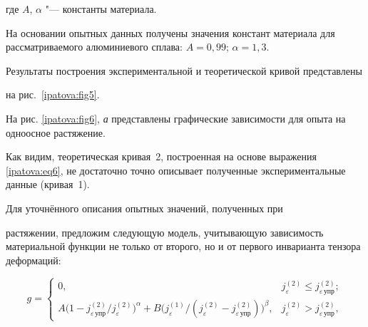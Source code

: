где $A$, $\alpha $ "--- константы материала.



На основании опытных данных получены значения констант материала для рассматриваемого алюминиевого сплава: $A=0,99$; $\alpha =1,3$. 

Результаты построения экспериментальной и теоретической кривой представлены

на рис.~\ref{ipatova:fig5}.













На рис. \ref{ipatova:fig6}, {\sl а} представлены графические зависимости для опыта на одноосное растяжение.

Как видим, теоретическая кривая~2, построенная на основе выражения \eqref{ipatova:eq6}, не достаточно точно описывает полученные экспериментальные данные (кривая~1). 

Для уточнённого описания опытных значений, полученных при

растяжении, предложим следующую модель, учитывающую зависимость материальной функции не только от второго, но и от первого инварианта тензора деформаций:

\begin{equation}

\label{ipatova:eq7}

g=\begin{cases}

0, & j_\varepsilon^{(2)} \le j_{\varepsilon \, \text{упр}}^{(2)}; \\

 A \bigl( 1-{j_{\varepsilon \, \text{упр}} ^{(2)}}/{j_{\varepsilon}^{(2)}} \bigr)^\alpha +B \bigl({j_\varepsilon^{(1)} }/({j_\varepsilon ^{(2)} -j_{\varepsilon \, \text{упр} }^{(2)}}) \bigr)^\beta , & j_\varepsilon^{(2)} >j_{\varepsilon \, \text{упр}}^{(2)},

\end{cases}

\end{equation}

